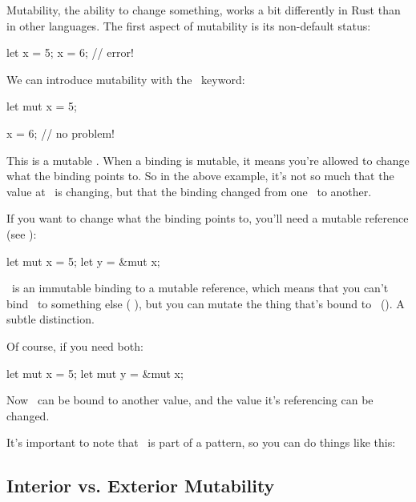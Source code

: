 Mutability, the ability to change something, works a bit differently in Rust than in other languages. The first aspect of 
mutability is its non-default status:

\begin{rustc}
let x = 5;
x = 6; // error!
\end{rustc}

We can introduce mutability with the \mut\ keyword:

\begin{rustc}
let mut x = 5;

x = 6; // no problem!
\end{rustc}

This is a mutable . When a binding is mutable, it means you're allowed to change what the 
binding points to. So in the above example, it's not so much that the value at \x\ is changing, but that the binding changed
from one \itt\ to another.

\blank

If you want to change what the binding points to, you'll need a mutable reference (see ):

\begin{rustc}
let mut x = 5;
let y = &mut x;
\end{rustc}

\y\ is an immutable binding to a mutable reference, which means that you can't bind \y\ to something else (
), but you can mutate the thing that's bound to \y\ (). A subtle distinction.

\blank

Of course, if you need both:

\begin{rustc}
let mut x = 5;
let mut y = &mut x;
\end{rustc}

Now \y\ can be bound to another value, and the value it's referencing can be changed.

\blank

It's important to note that \mut\ is part of a pattern, so you can do things like this:

\begin{rustc}
let (mut x, y) = (5, 6);

fn foo(mut x: i32) {
\end{rustc}

\subsection*{Interior vs. Exterior Mutability}

